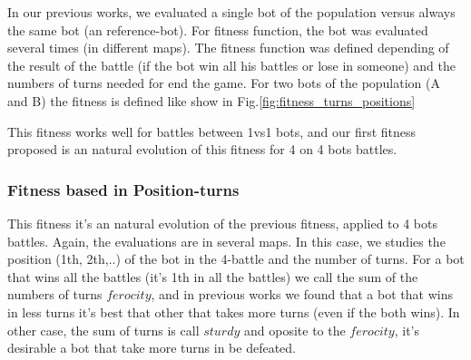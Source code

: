 \documentclass{llncs}
\begin{document}
In our previous works, we evaluated a single bot of the population versus always the same bot (an reference-bot). For fitness function, the bot was evaluated several times (in different maps). The fitness function was defined depending of the result of the battle (if the bot win all his battles or lose in someone) and the numbers of turns needed for end the game. For two bots of the population (A and B) the fitness is defined like show in Fig.\ref{fig:fitness_turns_positions} 

This fitness works well for battles between 1vs1 bots, and our first fitness proposed is an natural evolution of this fitness for 4 on 4 bots battles.


\subsubsection{Fitness based in Position-turns}

This fitness it's an natural evolution of the previous fitness, applied to 4 bots battles. Again, the evaluations are in several maps. In this case, we studies the position (1th, 2th,..) of the bot in the 4-battle and the number of turns. For a bot that wins all the battles (it's 1th in all the battles) we call the sum of the numbers of turns {$ferocity$}, and in previous works we found that a bot that wins in less turns it's best that other that takes more turns (even if the both wins). In other case, the sum of turns is call {$sturdy$} and oposite to the {$ferocity$}, it's desirable a bot that take more turns in be defeated.
\end{document}
